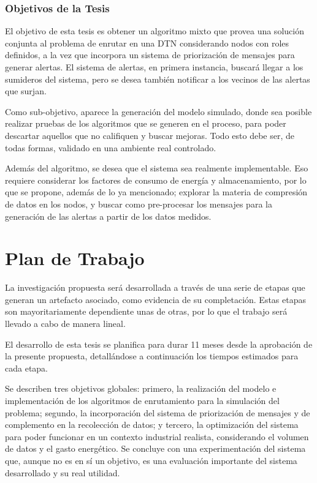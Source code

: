 \documentclass[10pt,preprint,onecolumn]{paper}
\begin{document}
\section{Objetivos de la Tesis}

El objetivo de esta tesis es obtener un algoritmo mixto que provea una solución conjunta al problema de enrutar en una DTN considerando nodos con roles definidos, a la vez que incorpora un sistema de priorización de mensajes para generar alertas. El sistema de alertas, en primera instancia, buscará llegar a los sumideros del sistema, pero se desea también notificar a los vecinos de las alertas que surjan.

Como sub-objetivo, aparece la generación del modelo simulado, donde sea posible realizar pruebas de los algoritmos que se generen en el proceso, para poder descartar aquellos que no califiquen y buscar mejoras. Todo esto debe ser, de todas formas, validado en una ambiente real controlado.

Además del algoritmo, se desea que el sistema sea realmente implementable. Eso requiere considerar los factores de consumo de energía y almacenamiento, por lo que se propone, además de lo ya mencionado; explorar la materia de compresión de datos en los nodos, y buscar como pre-procesar los mensajes para la generación de las alertas a partir de los datos medidos.

\clearpage
\part{Plan de Trabajo}
La investigación propuesta será desarrollada a través de una serie de etapas que generan un artefacto asociado, como evidencia de su completación. Estas etapas son mayoritariamente dependiente unas de otras, por lo que el trabajo será llevado a cabo de manera lineal.

El desarrollo de esta tesis se planifica para durar 11 meses desde la aprobación de la presente propuesta, detallándose a continuación los tiempos estimados para cada etapa.

Se describen tres objetivos globales: primero, la realización del modelo e implementación de los algoritmos de enrutamiento para la simulación del problema; segundo, la incorporación del sistema de priorización de mensajes y de complemento en la recolección de datos; y tercero, la optimización del sistema para poder funcionar en un contexto industrial realista, considerando el volumen de datos y el gasto energético. Se concluye con una experimentación del sistema que, aunque no es en sí un objetivo, es una evaluación importante del sistema desarrollado y su real utilidad.
\end{document}
